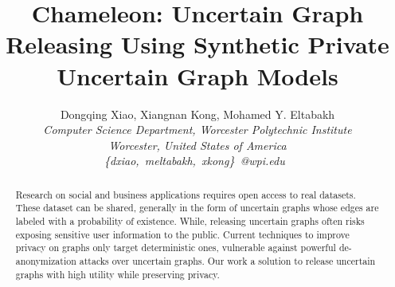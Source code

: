\documentclass[10pt,conference,letterpaper]{IEEEtran}
\title{Chameleon: Uncertain Graph Releasing Using Synthetic Private Uncertain Graph Models}
\author{%
{Dongqing Xiao, Xiangnan Kong, Mohamed Y. Eltabakh}%
\vspace{1.4mm}\\
\fontsize{10}{10}\selectfont\itshape
Computer Science Department, Worcester Polytechnic Institute \\
Worcester, United States of America\\
\fontsize{9}{9}\selectfont\ttfamily\upshape
\{dxiao,~meltabakh,~xkong\}~@wpi.edu\
}
\theoremstyle{plain}
\begin{document}
\maketitle


%

\begin{abstract}  
Research on social and business applications requires open access to real datasets. These dataset can be shared, generally in the form of uncertain graphs whose edges are labeled with a probability of existence. While, releasing uncertain graphs often risks exposing sensitive user information to the public. Current techniques to improve privacy on graphs only target deterministic ones, vulnerable against powerful de-anonymization attacks over uncertain graphs. Our work a solution to release uncertain graphs with high utility while preserving privacy. 
\end{abstract}





\end{document}
